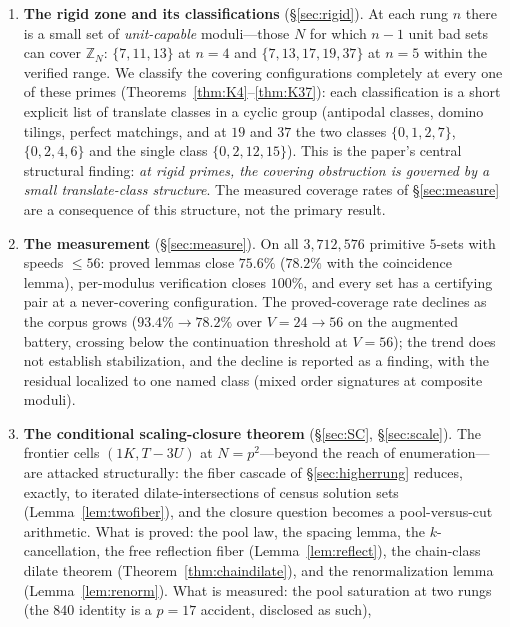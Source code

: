 \documentclass[11pt,a4paper]{article}
\numberwithin{equation}{section}
\theoremstyle{plain}
\theoremstyle{plain}
\theoremstyle{definition}
\theoremstyle{remark}
\newcommand{\Z}{\mathbb{Z}}
\begin{document}
\begin{enumerate}[leftmargin=1.6em,itemsep=2pt]
  (Lemma~\ref{lem:lift}), and a class-group reduction at prime moduli
  (Lemma~\ref{lem:class}).
\item \textbf{The rigid zone and its classifications}
  (\S\ref{sec:rigid}). At each rung $n$ there is a small set of
  \emph{unit-capable} moduli---those $N$ for which $n-1$ unit bad sets can
  cover $\Z_N$: $\{7,11,13\}$ at $n=4$ and $\{7,13,17,19,37\}$ at $n=5$
  within the verified range. We classify the covering configurations
  completely at every one of these primes
  (Theorems~\ref{thm:K4}--\ref{thm:K37}): each classification is a short
  explicit list of translate classes in a cyclic group (antipodal classes,
  domino tilings, perfect matchings, and at $19$ and $37$ the two classes
  $\{0,1,2,7\}$, $\{0,2,4,6\}$ and the single class $\{0,2,12,15\}$).
  This is the paper's central structural finding: \emph{at rigid primes,
  the covering obstruction is governed by a small translate-class
  structure}. The measured coverage rates of \S\ref{sec:measure} are a
  consequence of this structure, not the primary result.
\item \textbf{The measurement} (\S\ref{sec:measure}). On all
  $3{,}712{,}576$ primitive $5$-sets with speeds $\le 56$: proved lemmas
  close $75.6\%$ ($78.2\%$ with the coincidence lemma), per-modulus
  verification closes $100\%$, and every set has a certifying pair at a
  never-covering configuration. The proved-coverage rate declines as the
  corpus grows ($93.4\%\to78.2\%$ over $V=24\to56$ on the augmented
  battery, crossing below the continuation threshold at $V=56$); the trend
  does not establish stabilization, and the decline is reported as a
  finding, with the residual localized to one named class (mixed order
  signatures at composite moduli).
\item \textbf{The conditional scaling-closure theorem}
  (\S\ref{sec:SC}, \S\ref{sec:scale}). The frontier cells
  $(1K,T{-}3U)$ at $N=p^2$---beyond the reach of enumeration---are
  attacked structurally: the fiber cascade of \S\ref{sec:higherrung}
  reduces, exactly, to iterated dilate-intersections of census solution
  sets (Lemma~\ref{lem:twofiber}), and the closure question becomes a
  pool-versus-cut arithmetic. What is proved: the pool law, the spacing
  lemma, the $k$-cancellation, the free reflection fiber
  (Lemma~\ref{lem:reflect}), the chain-class dilate theorem
  (Theorem~\ref{thm:chaindilate}), and the renormalization lemma
  (Lemma~\ref{lem:renorm}). What is measured: the pool saturation at two
  rungs (the $840$ identity is a $p=17$ accident, disclosed as such),

\end{enumerate}
\end{document}
